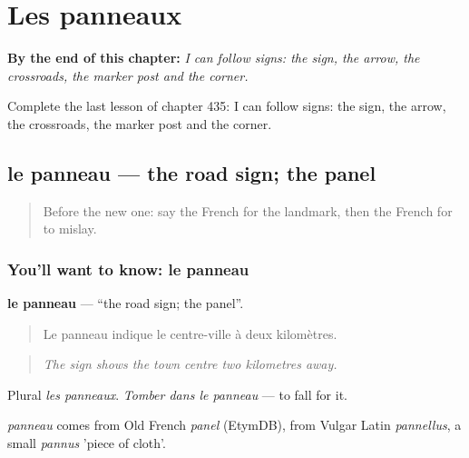 
\chapter{Les panneaux}
\label{ch:fr-les-panneaux}

\begin{chapteropening}
\textbf{By the end of this chapter:} \emph{I can follow signs: the sign, the arrow, the crossroads, the marker post and the corner.}

Complete the last lesson of chapter 435: I can follow signs: the sign, the arrow, the crossroads, the marker post and the corner.
\end{chapteropening}

\section[le panneau]{le panneau — the road sign; the panel}

\label{lesson:FR-C435-panneau}



\begin{quote}
Before the new one: say the French for the landmark, then the French for to mislay.
\end{quote}

\subsection*{You'll want to know: le panneau}
\textbf{le panneau} — \textquotedblleft{}the road sign; the panel\textquotedblright{}.

\begin{quote}
Le panneau indique le centre-ville à deux kilomètres.
\end{quote}

\begin{quote}
\emph{The sign shows the town centre two kilometres away.}
\end{quote}

Plural \emph{les panneaux}. \emph{Tomber dans le panneau} — to fall for it.

\begin{cousinweb}
\emph{panneau} comes from Old French \emph{panel} (EtymDB), from Vulgar Latin \emph{pannellus}, a small \emph{pannus} 'piece of cloth'.
\end{cousinweb}

